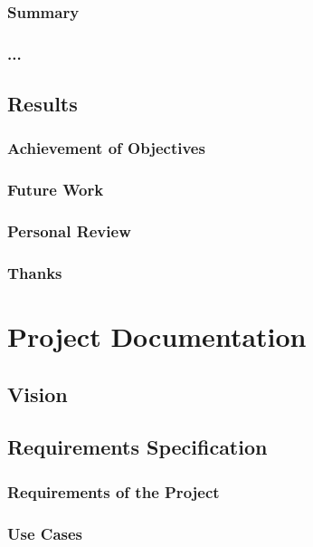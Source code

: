 \documentclass[a4paper,parskip=full]{scrreprt}
\begin{document}
\section{Summary}
\section{...}

\chapter{Results}
\section{Achievement of Objectives}
\section{Future Work}
\section{Personal Review}
\section{Thanks}


\part{Project Documentation}
\chapter{Vision}

\chapter{Requirements Specification}
\section{Requirements of the Project}
\section{Use Cases}
\end{document}
